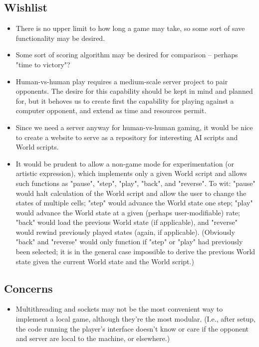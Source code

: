 \documentclass[letterpaper]{article}
\begin{document}
\subsection{Wishlist}

\begin{itemize}
	\item There is no upper limit to how long a game may take, so some sort of save functionality may be desired.
	\item Some sort of scoring algorithm may be desired for comparison -- perhaps "time to victory"?
	\item Human-vs-human play requires a medium-scale server project to pair opponents. The desire for this capability should be kept in mind and planned for, but it behoves us to create first the capability for playing against a computer opponent, and extend as time and resources permit.
	\item Since we need a server anyway for human-vs-human gaming, it would be nice to create a website to serve as a repository for interesting AI scripts and World scripts.
	\item It would be prudent to allow a non-game mode for experimentation (or artistic expression), which implements only a given World script and allows such functions as "pause", "step", "play", "back", and "reverse". To wit: "pause" would halt calculation of the World script and allow the user to change the states of multiple cells; "step" would advance the World state one step; "play" would advance the World state at a given (perhaps user-modifiable) rate; "back" would load the previous World state (if applicable), and "reverse" would rewind previously played states (again, if applicable). (Obviously "back" and "reverse" would only function if "step" or "play" had previously been selected; it is in the general case impossible to derive the previous World state given the current World state and the World script.)
\end{itemize}

\subsection{Concerns}

\begin{itemize}
	\item Multithreading and sockets may not be the most convenient way to implement a local game, although they're the most modular. (I.e., after setup, the code running the player's interface doesn't know or care if the opponent and server are local to the machine, or elsewhere.)
\end{itemize}
\end{document}
